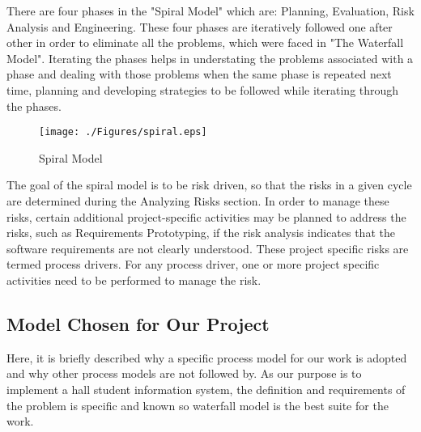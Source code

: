 There are four phases in the "Spiral Model" which are: Planning,
Evaluation, Risk Analysis and Engineering. These four phases are
iteratively followed one after other in order to eliminate all the
problems, which were faced in "The Waterfall Model". Iterating the
phases helps in understating the problems associated with a phase
and dealing with those problems when the same phase is repeated
next time, planning and developing strategies to be followed while
iterating through the phases.

\begin{figure}[htbp]
  \centering
\texttt{[image: ./Figures/spiral.eps]}
  \caption[Spiral Model]{Spiral Model}
  \label{fig:Spiral}
\end{figure}

The goal of the spiral model is to be risk driven, so that the
risks in a given cycle are determined during the Analyzing Risks
section. In order to manage these risks, certain additional
project-specific activities may be planned to address the risks,
such as Requirements Prototyping, if the risk analysis indicates
that the software requirements are not clearly understood. These
project specific risks are termed process drivers. For any process
driver, one or more project specific activities need to be
performed to manage the risk.



\subsection{Model Chosen for Our Project}
Here, it is briefly described why a specific process model for our
work is adopted and why other process models are not followed by.
As our purpose is to implement a hall student information system,
the definition and requirements of the problem is specific and
known so waterfall model is the best suite for the work.


